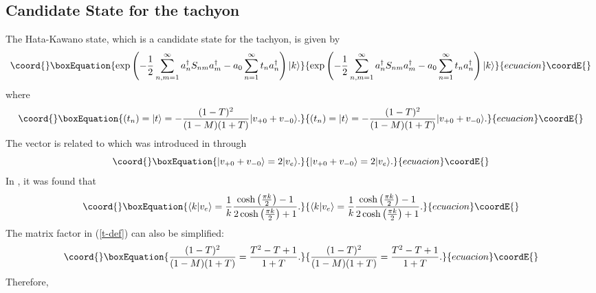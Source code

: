 \documentclass[a4paper,12pt]{article}
\begin{document}
\subsection{Candidate State for the tachyon}

The Hata-Kawano state, which is a candidate state for the tachyon, 
is given by \cite{Hata-Kawano}
\begin{equation}\coord{}\boxEquation{
\exp\left(-\frac{1}{2}\sum_{n,m=1}^{\infty}
a^{\dagger}_n S_{nm} a^{\dagger}_m
-a_0 \sum_{n=1}^{\infty} t_n a^{\dagger}_n\right)|k\rangle
}{
\exp\left(-\frac{1}{2}\sum_{n,m=1}^{\infty}
a^{\dagger}_n S_{nm} a^{\dagger}_m
-a_0 \sum_{n=1}^{\infty} t_n a^{\dagger}_n\right)|k\rangle
}{ecuacion}\coordE{}\end{equation}
where
\begin{equation}\coord{}\boxEquation{\label{t-def}
(t_n)= |t\rangle
=-\frac{(1-T)^2}{(1-M)(1+T)}|v_{+0}+v_{-0}\rangle.
}{(t_n)= |t\rangle
=-\frac{(1-T)^2}{(1-M)(1+T)}|v_{+0}+v_{-0}\rangle.
}{ecuacion}\coordE{}\end{equation}
The vector \coordHE{} is related to \coordHE{} which was
introduced in \cite{Okuyama-tension} through
\begin{equation}\coord{}\boxEquation{
|v_{+0}+v_{-0}\rangle=2|v_{e}\rangle.
}{
|v_{+0}+v_{-0}\rangle=2|v_{e}\rangle.
}{ecuacion}\coordE{}\end{equation}
In \cite{Okuyama-tension}, it was found that
\begin{equation}\coord{}\boxEquation{\label{kve}
    \langle k|v_e\rangle=\frac{1}{k}\frac{\cosh\left(\frac{\pi
    k}{2}\right)-1}{2\cosh\left(\frac{\pi
    k}{2}\right)+1}.
}{\langle k|v_e\rangle=\frac{1}{k}\frac{\cosh\left(\frac{\pi
    k}{2}\right)-1}{2\cosh\left(\frac{\pi
    k}{2}\right)+1}.
}{ecuacion}\coordE{}\end{equation}
 The matrix factor in (\ref{t-def}) can also
be simplified:
\begin{equation}\coord{}\boxEquation{
\frac{(1-T)^2}{(1-M)(1+T)}=\frac{T^2-T+1}{1+T}.
}{
\frac{(1-T)^2}{(1-M)(1+T)}=\frac{T^2-T+1}{1+T}.
}{ecuacion}\coordE{}\end{equation}
Therefore,
\end{document}
